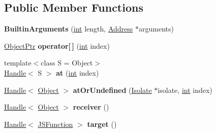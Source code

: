 \subsection*{Public Member Functions}
\begin{DoxyCompactItemize}
\item 
\mbox{\label{classv8_1_1internal_1_1BuiltinArguments_aebee3e503fdfb7b84fa0b95a21e9498c}} 
{\bfseries Builtin\+Arguments} (\mbox{\hyperlink{classint}{int}} length, \mbox{\hyperlink{classuintptr__t}{Address}} $\ast$arguments)
\item 
\mbox{\label{classv8_1_1internal_1_1BuiltinArguments_acdddd26c6e8c76a4cb01a3ea4e57e9db}} 
\mbox{\hyperlink{classv8_1_1internal_1_1ObjectPtr}{Object\+Ptr}} {\bfseries operator\mbox{[}$\,$\mbox{]}} (\mbox{\hyperlink{classint}{int}} index)
\item 
\mbox{\label{classv8_1_1internal_1_1BuiltinArguments_a80c550746e2536472a31c588c1a53e86}} 
{\footnotesize template$<$class S  = Object$>$ }\\\mbox{\hyperlink{classv8_1_1internal_1_1Handle}{Handle}}$<$ S $>$ {\bfseries at} (\mbox{\hyperlink{classint}{int}} index)
\item 
\mbox{\label{classv8_1_1internal_1_1BuiltinArguments_af4379a8c6a84319f419725e3ae335787}} 
\mbox{\hyperlink{classv8_1_1internal_1_1Handle}{Handle}}$<$ \mbox{\hyperlink{classv8_1_1internal_1_1Object}{Object}} $>$ {\bfseries at\+Or\+Undefined} (\mbox{\hyperlink{classv8_1_1internal_1_1Isolate}{Isolate}} $\ast$isolate, \mbox{\hyperlink{classint}{int}} index)
\item 
\mbox{\label{classv8_1_1internal_1_1BuiltinArguments_af0de3801c8af8253729b98a5ddafaec7}} 
\mbox{\hyperlink{classv8_1_1internal_1_1Handle}{Handle}}$<$ \mbox{\hyperlink{classv8_1_1internal_1_1Object}{Object}} $>$ {\bfseries receiver} ()
\item 
\mbox{\label{classv8_1_1internal_1_1BuiltinArguments_abfadf49b9b62ae52c62258dfc2cba2bf}} 
\mbox{\hyperlink{classv8_1_1internal_1_1Handle}{Handle}}$<$ \mbox{\hyperlink{classv8_1_1internal_1_1JSFunction}{J\+S\+Function}} $>$ {\bfseries target} ()

\end{DoxyCompactItemize}
